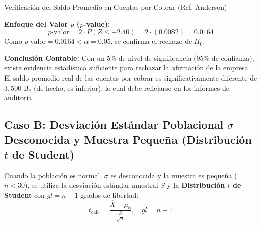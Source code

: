 \begin{ejemplo}{Verificación del Saldo Promedio en Cuentas por Cobrar (Ref. Anderson)}
\begin{enumerate}
    \textbf{Enfoque del Valor $p$ ($p$-value):}
    \[
    p\text{-valor} = 2 \cdot P(Z \le -2.40) = 2 \cdot (0.0082) = 0.0164
    \]
    Como $p\text{-valor} = 0.0164 < \alpha = 0.05$, se confirma el rechazo de $H_0$.
\end{enumerate}

\textbf{Conclusión Contable:} Con un 5\% de nivel de significancia (95\% de confianza), existe evidencia estadística suficiente para rechazar la afirmación de la empresa. El saldo promedio real de las cuentas por cobrar es significativamente diferente de $3{,}500$ Bs (de hecho, es inferior), lo cual debe reflejarse en los informes de auditoría.
\end{ejemplo}

\subsection{Caso B: Desviación Estándar Poblacional $\sigma$ Desconocida y Muestra Pequeña (Distribución $t$ de Student)}
Cuando la población es normal, $\sigma$ es desconocida y la muestra es pequeña ($n < 30$), se utiliza la desviación estándar muestral $S$ y la \textbf{Distribución $t$ de Student} con $gl = n - 1$ grados de libertad:
\begin{equation}
    t_{\text{calc}} = \frac{\bar{X} - \mu_0}{\frac{S}{\sqrt{n}}}, \quad gl = n - 1
\end{equation}

